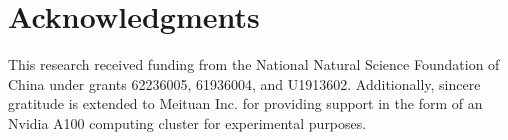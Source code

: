 \documentclass[conference]{IEEEtran}
\begin{document}
\section{Acknowledgments}
This research received funding from the National Natural Science Foundation of China under grants 62236005, 61936004, and U1913602. Additionally, sincere gratitude is extended to Meituan Inc. for providing support in the form of an Nvidia A100 computing cluster for experimental purposes.
\clearpage


\end{document}
